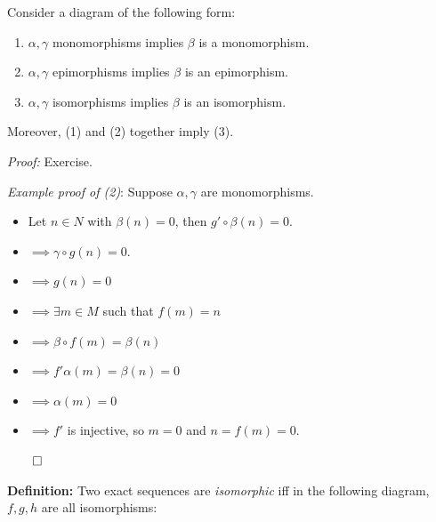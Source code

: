 Consider a diagram of the following form:


\begin{enumerate}
\def\labelenumi{\arabic{enumi}.}
\item
  \(\alpha, \gamma\) monomorphisms implies \(\beta\) is a monomorphism.
\item
  \(\alpha, \gamma\) epimorphisms implies \(\beta\) is an epimorphism.
\item
  \(\alpha, \gamma\) isomorphisms implies \(\beta\) is an isomorphism.
\end{enumerate}

Moreover, (1) and (2) together imply (3).

\emph{Proof:} Exercise.

\emph{Example proof of (2)}: Suppose \(\alpha, \gamma\) are
monomorphisms.

\begin{itemize}
\tightlist
\item
  Let \(n\in N\) with \(\beta(n) = 0\), then \(g' \circ \beta(n) = 0\).
\item
  \(\implies \gamma \circ g (n) = 0\).
\item
  \(\implies g(n) = 0\)
\item
  \(\implies \exists m\in M\) such that \(f(m) = n\)
\item
  \(\implies \beta \circ f (m) = \beta(n)\)
\item
  \(\implies f' \alpha(m) = \beta (n) = 0\)
\item
  \(\implies \alpha(m) = 0\)
\item
  \(\implies f'\) is injective, so \(m=0\) and \(n=f(m) = 0\).
\end{itemize}

\(\qed\)

\textbf{Definition:} Two exact sequences are \emph{isomorphic} iff in
the following diagram, \(f,g,h\) are all isomorphisms:

